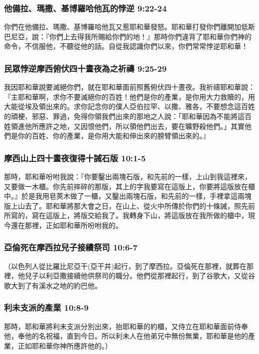 \subsubsection{他備拉、瑪撒、基博羅哈他瓦的悖逆 9:22-24}
你們在他備拉、瑪撒、基博羅哈他瓦又惹耶和華發怒。耶和華打發你們離開加低斯巴尼亞，說：『你們上去得我所賜給你們的地！』那時你們違背了耶和華你們神的命令，不信服他，不聽從他的話。自從我認識你們以來，你們常常悖逆耶和華！

\subsubsection{民眾悖逆摩西俯伏四十晝夜為之祈禱 9:25-29}
我因耶和華說要滅絕你們，就在耶和華面前照舊俯伏四十晝夜。我祈禱耶和華說：『主耶和華啊，求你不要滅絕你的百姓！他們是你的產業，是你用大力救贖的，用大能從埃及領出來的。求你記念你的僕人亞伯拉罕、以撒、雅各，不要想念這百姓的頑梗、邪惡、罪過，免得你領我們出來的那地之人說：「耶和華因為不能將這百姓領進他所應許之地，又因恨他們，所以領他們出去，要在曠野殺他們。」其實他們是你的百姓、你的產業，是你用大能和伸出來的膀臂領出來的。』

\subsubsection{摩西山上四十晝夜復得十誡石版 10:1-5}
那時，耶和華吩咐我說：『你要鑿出兩塊石版，和先前的一樣，上山到我這裡來，又要做一木櫃。你先前摔碎的那版，其上的字我要寫在這版上，你要將這版放在櫃中。』於是我用皂莢木做了一櫃，又鑿出兩塊石版，和先前的一樣，手裡拿這兩塊版上山去了。耶和華將那大會之日，在山上、從火中所傳於你們的十條誡，照先前所寫的，寫在這版上，將版交給我了。我轉身下山，將這版放在我所做的櫃中，現今還在那裡，正如耶和華所吩咐我的。

\subsubsection{亞倫死在摩西拉兒子接續祭司 10:6-7}
（以色列人從比羅比尼亞干(亞干井)起行，到了摩西拉。亞倫死在那裡，就葬在那裡，他兒子以利亞撒接續他供祭司的職分。他們從那裡起行，到了谷歌大，又從谷歌大到了有溪水之地的約巴他。

\subsubsection{利未支派的產業 10:8-9}
那時，耶和華將利未支派分別出來，抬耶和華的約櫃，又侍立在耶和華面前侍奉他，奉他的名祝福，直到今日。所以利未人在他弟兄中無份無業，耶和華是他的產業，正如耶和華你神所應許他的。）

